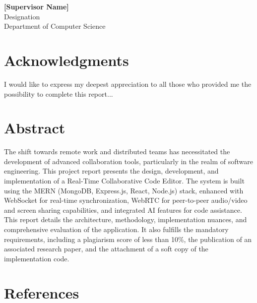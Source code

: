 \documentclass[12pt,a4paper]{report}
\begin{document}
\vspace{3cm}
\begin{flushleft}
\textbf{[Supervisor Name]}\\
Designation\\
Department of Computer Science\\
\end{flushleft}

\chapter*{Acknowledgments}
I would like to express my deepest appreciation to all those who provided me the possibility to complete this report...

\chapter*{Abstract}
The shift towards remote work and distributed teams has necessitated the development of advanced collaboration tools, particularly in the realm of software engineering. This project report presents the design, development, and implementation of a Real-Time Collaborative Code Editor. The system is built using the MERN (MongoDB, Express.js, React, Node.js) stack, enhanced with WebSocket for real-time synchronization, WebRTC for peer-to-peer audio/video and screen sharing capabilities, and integrated AI features for code assistance. This report details the architecture, methodology, implementation nuances, and comprehensive evaluation of the application. It also fulfills the mandatory requirements, including a plagiarism score of less than 10\%, the publication of an associated research paper, and the attachment of a soft copy of the implementation code.

\tableofcontents
\listoffigures
\listoftables

\clearpage
{}


% 
% 
% 
% 
% 

\chapter*{References}
\end{document}
